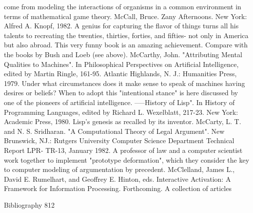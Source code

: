   come from modeling the interactions of organisms in a common environment in terms of
  mathematical game theory.
McCall, Bruce. Zany Afternoons. New York: Alfred A. Knopf, 1982. A genius for capturing
  the flavor of things turns all his talents to recreating the twenties, thirties, forties, and fifties-
  not only in America but also abroad. This very funny book is an amazing achievement.
  Compare with the books by Bush and Loeb (see above).
McCarthy, John. "Attributing Mental Qualities to Machines". In Philosophical Perspectives
  on Artificial Intelligence, edited by Martin Ringle, 161-95. Atlantic Highlands, N. J.:
  Humanities Press, 1979. Under what circumstances does it make sense to speak of machines
  having desires or beliefs? When to adopt this "intentional stance" is here discussed by one
  of the pioneers of artificial intelligence.
-----History of Lisp". In History of Programming Languages, edited by Richard L.
  Wexelblatt, 217-23. New York: Academic Press, 1980. Lisp's genesis as recalled by its
  inventor.
McCarty, L. T. and N. S. Sridharan. "A Computational Theory of Legal Argument". New
  Brunswick, NJ.: Rutgers University Computer Science Department Technical Report LPR-
  TR-13, January 1982. A professor of law and a computer scientist work together to
  implement "prototype deformation", which they consider the key to computer modeling of
  argumentation by precedent.
McClelland, James L., David E. Rumelhart, and Geoffrey E. Hinton, eds. Interactive
  Activation: A Framework for Information Processing. Forthcoming. A collection of articles

Bibliography                                                                                       812

